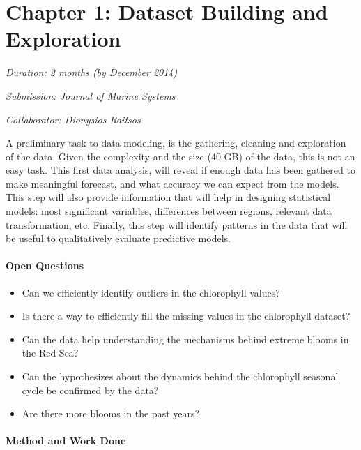 \section{Chapter 1: Dataset Building and Exploration}

\noindent
\emph{Duration: 2 months (by December 2014)}

\noindent
\emph{Submission: Journal of Marine Systems}

\noindent
\emph{Collaborator: Dionysios Raitsos}

A preliminary task to data modeling, is the gathering, cleaning and exploration of the data. Given the complexity and the size (40 GB) of the data, this is not an easy task. This first data analysis, will reveal if enough data has been gathered to make meaningful forecast, and what accuracy we can expect from the models. This step will also provide information that will help in designing statistical models: most significant variables, differences between regions, relevant data transformation, etc. Finally, this step will identify patterns in the data that will be useful to qualitatively evaluate predictive models.

\paragraph{Open Questions}

\begin{itemize}
\item Can we efficiently identify outliers in the chlorophyll values?
\item Is there a way to efficiently fill the missing values in the chlorophyll dataset?
\item Can the data help understanding the mechanisms behind extreme blooms in the Red Sea?
\item Can the hypothesizes about the dynamics behind the chlorophyll seasonal cycle be confirmed by the data?
\item Are there more blooms in the past years?
\end{itemize}

\paragraph{Method and Work Done}

